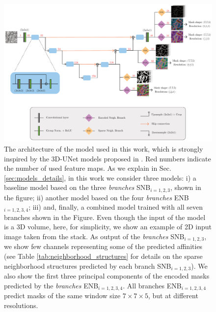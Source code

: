 \begin{figure}[t]
\centering
        \includegraphics[width=\textwidth]{./figs/UNet_architecture.pdf} %
        \vspace{1em}
        \caption{The architecture of the model used in this work, which is strongly inspired by the 3D-UNet models proposed in \cite{lee2017superhuman,funke2018large}. 
        Red numbers indicate the number of used feature maps.
        As we explain in Sec. \ref{sec:models_details}, in this work we consider three models: i) a baseline model based on the three \emph{\sparseBr branches} SNB$_{i=1,2,3}$, shown in the figure; ii) another model based on the four \emph{\encBr branches} ENB$_{i=1,2,3,4}$; iii) and, finally, a combined model trained with all seven branches shown in the Figure.
        Even though the input of the model is a 3D volume, here, for simplicity, we show an example of 2D input image taken from the stack. As output of the \emph{\sparseBr branches} SNB$_{i=1,2,3}$, we show few channels representing some of the predicted affinities (see Table \ref{tab:neighborhood_structures} for details on the sparse neighborhood structures predicted by each branch SNB$_{i=1,2,3}$). We also show the first three principal components of the encoded masks predicted by the \emph{\encBr branches} ENB$_{i=1,2,3,4}$. All branches ENB$_{i=1,2,3,4}$ predict \maskname masks of the same window size $7 \times 7 \times 5$, but at different resolutions.}
    \label{fig:model_architecture}
\end{figure}

